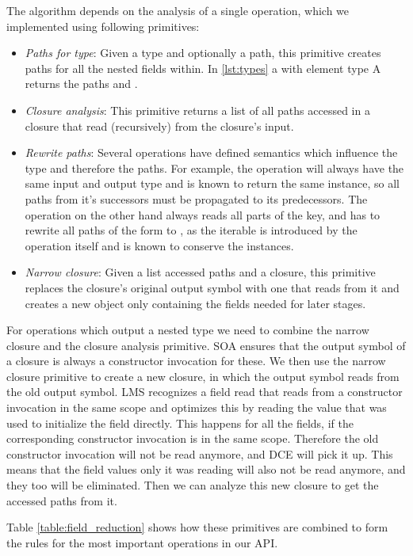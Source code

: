 The algorithm depends on the analysis of a single operation, which we implemented using following primitives:
\begin{itemize}
\item \emph{Paths for type}: Given a type and optionally a path, this primitive creates paths for all the nested fields within. In \ref{lst:types} a  with element type A returns the paths  and . 
\item \emph{Closure analysis}: This primitive returns a list of all paths accessed in a closure that read (recursively) from the closure's input.
\item \emph{Rewrite paths}: Several operations have defined semantics which influence the type and therefore the paths. For example, the  operation will always have the same input and output type and is known to return the same instance, so all paths from it's successors must be propagated to its predecessors. The  operation on the other hand always reads all parts of the key, and has to rewrite all paths of the form  to , as the iterable is introduced by the operation itself and is known to conserve the instances.
\item \emph{Narrow closure}: Given a list accessed paths and a closure, this primitive replaces the closure's original output symbol with one that reads from it and creates a new object only containing the fields needed for later stages.
\end{itemize}

For  operations which output a nested type we need to combine the narrow closure and the closure analysis primitive. SOA ensures that the output symbol of a closure is always a constructor invocation for these. We then use the narrow closure primitive to create a new closure, in which the output symbol reads from the old output symbol. LMS recognizes a field read that reads from a constructor invocation in the same scope and optimizes this by reading the value that was used to initialize the field directly. This happens for all the fields, if the corresponding constructor invocation is in the same scope. Therefore the old constructor invocation will not be read anymore, and DCE will pick it up. This means that the field values only it was reading will also not be read anymore, and they too will be eliminated. Then we can analyze this new closure to get the accessed paths from it. 

Table \ref{table:field_reduction} shows how these primitives are combined to form the rules for the most important operations in our API.

